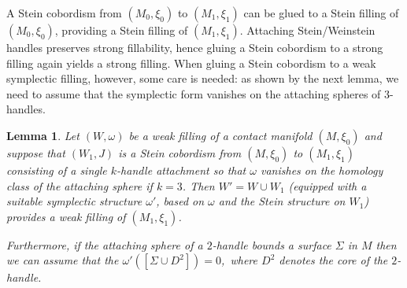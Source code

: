 \documentclass[12pt]{amsart}
\newtheorem{Lemma}[Theorem]{Lemma}
\theoremstyle{remark}
\begin{document}
\begin{comment}
\noindent Since contact surgery corresponds to attaching Weinstein
handles, it is easy to see that exact and strong fillability are
invariant under such surgeries. That Stein fillability is also an
invariant of contact surgery is also true, although the extension of
the Stein structure is much more difficult
(cf.\ \cite{Cieliebak&Eliashberg12}). Moreover, Eliashberg's
$h$-principle implies that any surgery up to the middle dimension can
be realized via Legendrian surgery, provided that the dimension of the
manifold is at least $5$ and an almost complex structure extends over
the handle (cf.\,\cite{Eliashberg??}). In the case of weak fillings we
have the following
\end{comment}

A Stein cobordism from $(M_0, \xi _0)$ to $(M_1, \xi _1)$ can be glued
to a Stein filling of $(M_0, \xi _0)$, providing a Stein filling of
$(M_1, \xi _1)$. Attaching Stein/Weinstein handles preserves strong
fillability, hence gluing a Stein cobordism to a strong filling again
yields a strong filling. 
When gluing a Stein cobordism to a weak symplectic filling, however,
some care is needed: as shown by the next lemma, we need to assume
that the symplectic form vanishes on the attaching spheres of
$3$-handles.

\begin{Lemma}\label{weak_fill}
Let $(W ,\omega)$ be a weak filling of a contact manifold $(M ,\xi_0)$
and suppose that $(W_1, J)$ is a Stein cobordism from $(M, \xi _0)$ to
$(M_1, \xi _1)$ consisting of a single $k$-handle attachment so that
$\omega$ vanishes on the homology class of the
attaching sphere if $k =3$. Then $W' = W\cup
W_1$ (equipped with a suitable symplectic structure $\omega'$, based
on $\omega $ and the Stein structure on $W_1$) provides a weak filling
of $(M_1, \xi _1)$.

Furthermore, if the attaching sphere of a $2$-handle bounds a surface
$\Sigma$ in $M$ then we can assume that the $\omega'([\Sigma \cup
  D^2]) = 0$,\ where $D^2$ denotes the core of the $2$-handle.
\end{Lemma}
\end{document}
